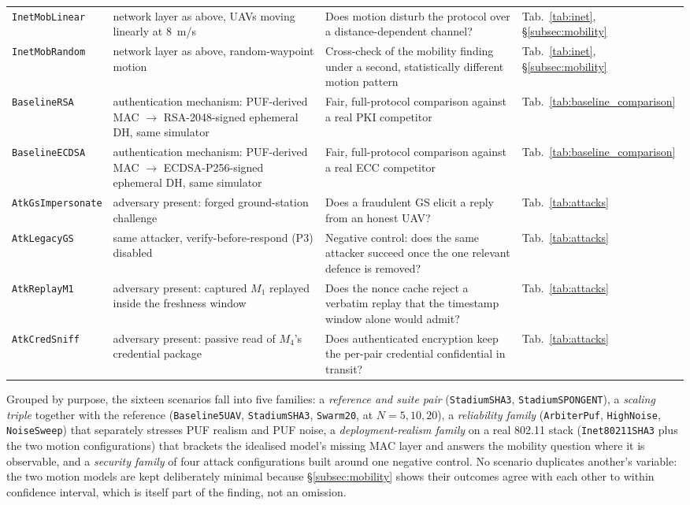 \documentclass[11pt,a4paper]{article}
\begin{document}
\begin{table}[H]
\begin{tabular}{@{}p{3.1cm}p{4.2cm}p{5.4cm}p{1.6cm}@{}}
\texttt{InetMobLinear} & network layer as above, UAVs moving linearly at $8$~m/s & Does motion disturb the protocol over a distance-dependent channel? & Tab.~\ref{tab:inet}, \S\ref{subsec:mobility} \\
\texttt{InetMobRandom} & network layer as above, random-waypoint motion & Cross-check of the mobility finding under a second, statistically different motion pattern & Tab.~\ref{tab:inet}, \S\ref{subsec:mobility} \\
\texttt{BaselineRSA} & authentication mechanism: PUF-derived MAC $\rightarrow$ RSA-2048-signed ephemeral DH, same simulator & Fair, full-protocol comparison against a real PKI competitor & Tab.~\ref{tab:baseline_comparison} \\
\texttt{BaselineECDSA} & authentication mechanism: PUF-derived MAC $\rightarrow$ ECDSA-P256-signed ephemeral DH, same simulator & Fair, full-protocol comparison against a real ECC competitor & Tab.~\ref{tab:baseline_comparison} \\
\texttt{AtkGsImpersonate} & adversary present: forged ground-station challenge & Does a fraudulent GS elicit a reply from an honest UAV? & Tab.~\ref{tab:attacks} \\
\texttt{AtkLegacyGS} & same attacker, verify-before-respond (P3) disabled & Negative control: does the same attacker succeed once the one relevant defence is removed? & Tab.~\ref{tab:attacks} \\
\texttt{AtkReplayM1} & adversary present: captured $M_1$ replayed inside the freshness window & Does the nonce cache reject a verbatim replay that the timestamp window alone would admit? & Tab.~\ref{tab:attacks} \\
\texttt{AtkCredSniff} & adversary present: passive read of $M_4$'s credential package & Does authenticated encryption keep the per-pair credential confidential in transit? & Tab.~\ref{tab:attacks} \\
\bottomrule
\end{tabular}
\end{table}

Grouped by purpose, the sixteen scenarios fall into five families: a
\emph{reference and suite pair} (\texttt{StadiumSHA3}, \texttt{StadiumSPONGENT}),
a \emph{scaling triple} together with the reference
(\texttt{Baseline5UAV}, \texttt{StadiumSHA3}, \texttt{Swarm20}, at $N{=}5,10,20$),
a \emph{reliability family} (\texttt{ArbiterPuf}, \texttt{HighNoise},
\texttt{NoiseSweep}) that separately stresses PUF realism and PUF noise, a
\emph{deployment-realism family} on a real 802.11 stack
(\texttt{Inet80211SHA3} plus the two motion configurations) that brackets the
idealised model's missing MAC layer and answers the mobility question where it is
observable, and a \emph{security family} of four attack configurations built
around one negative control. No scenario duplicates another's variable: the two
motion models are kept deliberately minimal because \S\ref{subsec:mobility} shows
their outcomes agree with each other to within confidence interval, which is
itself part of the finding, not an omission.
\end{document}
